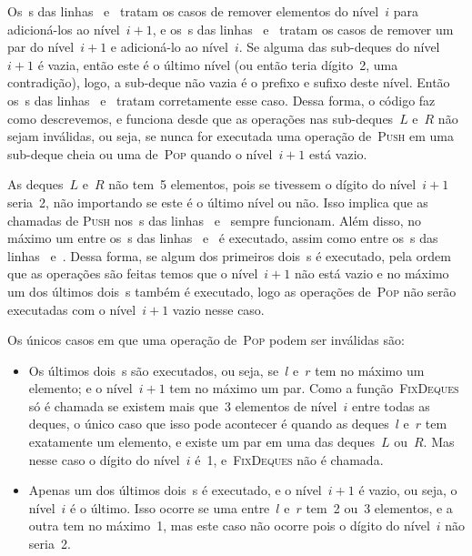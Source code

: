 \documentclass[main.tex]{subfiles}
\begin{document}
Os~s das linhas~ e~ tratam os casos de remover elementos do nível~$i$ para adicioná-los ao nível~$i+1$, e os~s das linhas~ e~ tratam os casos de remover um par do nível~$i+1$ e adicioná-lo ao nível~$i$. Se alguma das sub-deques do nível~$i+1$ é vazia, então este é o último nível (ou então teria dígito~2, uma contradição), logo, a sub-deque não vazia é o prefixo e sufixo deste nível. Então os~s das linhas~ e~ tratam corretamente esse caso. Dessa forma, o código faz como descrevemos, e funciona desde que as operações nas sub-deques~$L$ e~$R$ não sejam inválidas, ou seja, se nunca for executada uma operação de~\textsc{Push} em uma sub-deque cheia ou uma de~\textsc{Pop} quando o nível~$i+1$ está vazio.

As deques~$L$ e~$R$ não tem~5 elementos, pois se tivessem o dígito do nível~$i+1$ seria~2, não importando se este é o último nível ou não. Isso implica que as chamadas de \textsc{Push} nos~s das linhas~ e~ sempre funcionam. Além disso, no máximo um entre os~s das linhas~ e~ é executado, assim como entre os~s das linhas~ e~. Dessa forma, se algum dos primeiros dois~s é executado, pela ordem que as operações são feitas temos que o nível~$i+1$ não está vazio e no máximo um dos últimos dois~s também é executado, logo as operações de~\textsc{Pop} não serão executadas com o nível~$i+1$ vazio nesse caso.

Os únicos casos em que uma operação de~\textsc{Pop} podem ser inválidas são:
\begin{itemize}
    \item Os últimos dois~s são executados, ou seja, se~$l$ e~$r$ tem no máximo um elemento; e o nível~$i+1$ tem no máximo um par. Como a função~\textsc{FixDeques} só é chamada se existem mais que~3 elementos de nível~$i$ entre todas as deques, o único caso que isso pode acontecer é quando as deques~$l$ e~$r$ tem exatamente um elemento, e existe um par em uma das deques~$L$ ou~$R$. Mas nesse caso o dígito do nível~$i$ é~1, e~\textsc{FixDeques} não é chamada.
    \item Apenas um dos últimos dois~s é executado, e o nível~$i+1$ é vazio, ou seja, o nível~$i$ é o último. Isso ocorre se uma entre~$l$ e~$r$ tem~2 ou~3 elementos, e a outra tem no máximo~1, mas este caso não ocorre pois o dígito do nível~$i$ não seria~2.
\end{itemize}
\end{document}
